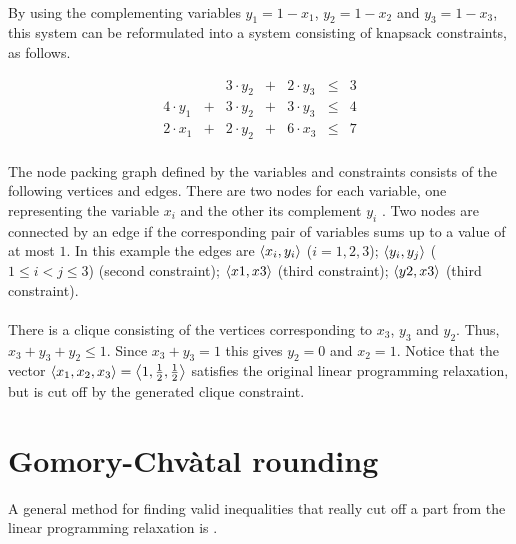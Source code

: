 {\begin{example}
\paragraph{}
By using the complementing variables $y_1=1-x_1$, $y_2=1-x_2$ and $y_3=1-x_3$, this system can be reformulated into a system consisting of knapsack constraints, as follows.

\begin{equation}
\begin{array}{rcrcrcr}
&&3\cdot y_2&+&2\cdot y_3&\leq&3\\
4\cdot y_1&+&3\cdot y_2&+&3\cdot y_3&\leq&4\\
2\cdot x_1&+&2\cdot y_2&+&6\cdot x_3&\leq&7
\end{array}
\end{equation}

\paragraph{}
The node packing graph defined by the variables and constraints consists of the following vertices and edges. There are two nodes for each variable, one representing the variable $x_i$ and the other its complement $y_i$ . Two nodes are connected by an edge if the corresponding pair of variables sums up to a value of at most $1$. In this example the edges are $\left\langle x_i,y_i \right\rangle$ ($i=1,2,3$); $\left\langle y_i,y_j \right\rangle$ ($1\leq i < j \leq 3$) (second constraint); $\left\langle x1,x3 \right\rangle$ (third constraint); $\left\langle y2,x3 \right\rangle$ (third constraint).


\paragraph{}
There is a clique consisting of the vertices corresponding to $x_3$, $y_3$ and $y_2$. Thus, $x_3+y_3+y_2\leq 1$. Since $x_3+y_3=1$ this gives $y_2=0$ and $x_2=1$. Notice that the vector $\left\langle x_1,x_2,x_3 \right\rangle=\left\langle 1,\frac{1}{2},\frac{1}{2} \right\rangle$ satisfies the original linear programming relaxation, but is cut off by the generated clique constraint.
\end{example}

\section{Gomory-Chv\`atal rounding}
A general method for finding valid inequalities that really cut off a part from the linear programming relaxation is .

}
